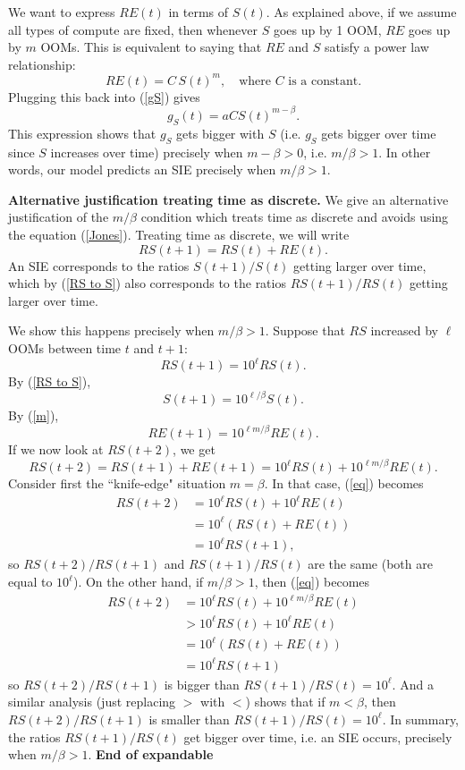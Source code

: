 \documentclass{article}
\theoremstyle{definition}
\begin{document}
We want to express $RE(t)$ in terms of $S(t)$. As explained above, if we assume all types of compute are fixed, then whenever $S$ goes up by 1 OOM, $RE$ goes up by $m$ OOMs. This is equivalent to saying that $RE$ and $S$ satisfy a power law relationship:
\[ RE(t) = C \, S(t)^m, \quad \text{where $C$ is a constant}.\]
Plugging this back into (\ref{gS}) gives
\[ g_S(t) = a C S(t)^{m-\beta}.\]
This expression shows that $g_S$ gets bigger with $S$ (i.e. $g_S$ gets bigger over time since $S$ increases over time) precisely when $m-\beta > 0$, i.e. $m/\beta > 1$. In other words, our model predicts an SIE precisely when $m/\beta > 1$.

\textbf{Alternative justification treating time as discrete.} We give an alternative justification of the $m/\beta$ condition which treats time as discrete and avoids using the equation (\ref{Jones}). Treating time as discrete, we will write
\[ RS(t+1) = RS(t) + RE(t).\]
An SIE corresponds to the ratios $S(t+1)/S(t)$ getting larger over time, which by (\ref{RS to S}) also corresponds to the ratios $RS(t+1)/RS(t)$ getting larger over time.

We show this happens precisely when $m/\beta > 1$. Suppose that $RS$ increased by $\ell$ OOMs between time $t$ and $t+1$:
\[ RS(t+1) = 10^\ell RS(t).\]
By (\ref{RS to S}),
\[ S(t+1) = 10^{\ell/\beta} S(t).\]
By (\ref{m}),
\[ RE(t+1) = 10^{\ell m/\beta} RE(t).\]
If we now look at $RS(t+2)$, we get
\begin{equation} \label{eq}
RS(t+2) = RS(t+1) + RE(t+1) = 10^\ell RS(t) + 10^{\ell m/\beta} RE(t).
\end{equation}
Consider first the ``knife-edge" situation $m = \beta$. In that case, (\ref{eq}) becomes
\[\begin{aligned}
RS(t+2) &= 10^\ell RS(t) + 10^\ell RE(t) \\
&= 10^\ell (RS(t) + RE(t)) \\
&= 10^\ell RS(t+1),
\end{aligned}\]
so $RS(t+2)/RS(t+1)$ and $RS(t+1)/RS(t)$ are the same (both are equal to $10^\ell$). On the other hand, if $m/\beta > 1$, then (\ref{eq}) becomes
\[\begin{aligned}
RS(t+2) &= 10^\ell RS(t) + 10^{\ell m/\beta} RE(t) \\
&> 10^\ell RS(t) + 10^\ell RE(t) \\
&= 10^\ell (RS(t) + RE(t)) \\
&= 10^\ell RS(t+1)
\end{aligned}\]
so $RS(t+2)/RS(t+1)$ is bigger than $RS(t+1)/RS(t) = 10^\ell$. And a similar analysis (just replacing $>$ with $<$) shows that if $m < \beta$, then $RS(t+2)/RS(t+1)$ is smaller than $RS(t+1)/RS(t) = 10^\ell$. In summary, the ratios $RS(t+1)/RS(t)$ get bigger over time, i.e. an SIE occurs, precisely when $m/\beta > 1$.
\textbf{End of expandable}
\end{document}
